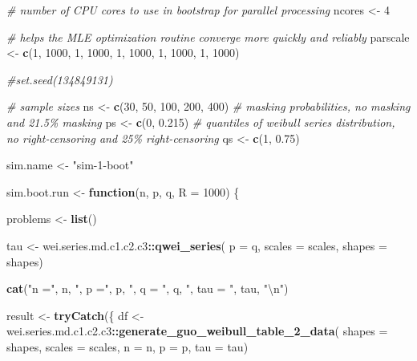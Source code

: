 \documentclass[
]{article}
\newenvironment{Shaded}{\begin{snugshade}}{\end{snugshade}}
\newcommand{\CharTok}[1]{\textcolor[rgb]{0.31,0.60,0.02}{#1}}
\newcommand{\CommentTok}[1]{\textcolor[rgb]{0.56,0.35,0.01}{\textit{#1}}}
\newcommand{\ControlFlowTok}[1]{\textcolor[rgb]{0.13,0.29,0.53}{\textbf{#1}}}
\newcommand{\DataTypeTok}[1]{\textcolor[rgb]{0.13,0.29,0.53}{#1}}
\newcommand{\DecValTok}[1]{\textcolor[rgb]{0.00,0.00,0.81}{#1}}
\newcommand{\FloatTok}[1]{\textcolor[rgb]{0.00,0.00,0.81}{#1}}
\newcommand{\KeywordTok}[1]{\textcolor[rgb]{0.13,0.29,0.53}{\textbf{#1}}}
\newcommand{\NormalTok}[1]{#1}
\newcommand{\OperatorTok}[1]{\textcolor[rgb]{0.81,0.36,0.00}{\textbf{#1}}}
\newcommand{\StringTok}[1]{\textcolor[rgb]{0.31,0.60,0.02}{#1}}
\begin{document}
\begin{Shaded}
\begin{Highlighting}[]
\CommentTok{\# number of CPU cores to use in bootstrap for parallel processing}
\NormalTok{ncores \textless{}{-}}\StringTok{ }\DecValTok{4}

\CommentTok{\# helps the MLE optimization routine converge more quickly and reliably}
\NormalTok{parscale \textless{}{-}}\StringTok{ }\KeywordTok{c}\NormalTok{(}\DecValTok{1}\NormalTok{, }\DecValTok{1000}\NormalTok{, }\DecValTok{1}\NormalTok{, }\DecValTok{1000}\NormalTok{, }\DecValTok{1}\NormalTok{, }\DecValTok{1000}\NormalTok{, }\DecValTok{1}\NormalTok{, }\DecValTok{1000}\NormalTok{, }\DecValTok{1}\NormalTok{, }\DecValTok{1000}\NormalTok{)}

\CommentTok{\#set.seed(134849131)}

\CommentTok{\# sample sizes}
\NormalTok{ns \textless{}{-}}\StringTok{ }\KeywordTok{c}\NormalTok{(}\DecValTok{30}\NormalTok{, }\DecValTok{50}\NormalTok{, }\DecValTok{100}\NormalTok{, }\DecValTok{200}\NormalTok{, }\DecValTok{400}\NormalTok{)}
\CommentTok{\# masking probabilities, no masking and 21.5\% masking}
\NormalTok{ps \textless{}{-}}\StringTok{ }\KeywordTok{c}\NormalTok{(}\DecValTok{0}\NormalTok{, }\FloatTok{0.215}\NormalTok{)}
\CommentTok{\# quantiles of weibull series distribution, no right{-}censoring and 25\% right{-}censoring}
\NormalTok{qs \textless{}{-}}\StringTok{ }\KeywordTok{c}\NormalTok{(}\DecValTok{1}\NormalTok{, }\FloatTok{0.75}\NormalTok{)}

\NormalTok{sim.name \textless{}{-}}\StringTok{ "sim{-}1{-}boot"}

\NormalTok{sim.boot.run \textless{}{-}}\StringTok{ }\ControlFlowTok{function}\NormalTok{(n, p, q, }\DataTypeTok{R =} \DecValTok{1000}\NormalTok{) \{}

\NormalTok{    problems \textless{}{-}}\StringTok{ }\KeywordTok{list}\NormalTok{()}

\NormalTok{    tau \textless{}{-}}\StringTok{ }\NormalTok{wei.series.md.c1.c2.c3}\OperatorTok{::}\KeywordTok{qwei\_series}\NormalTok{(}
        \DataTypeTok{p =}\NormalTok{ q, }\DataTypeTok{scales =}\NormalTok{ scales, }\DataTypeTok{shapes =}\NormalTok{ shapes)}

    \KeywordTok{cat}\NormalTok{(}\StringTok{"n ="}\NormalTok{, n, }\StringTok{", p ="}\NormalTok{, p, }\StringTok{", q = "}\NormalTok{, q, }\StringTok{", tau = "}\NormalTok{, tau, }\StringTok{"}\CharTok{\textbackslash{}n}\StringTok{"}\NormalTok{)}
  
\NormalTok{    result \textless{}{-}}\StringTok{ }\KeywordTok{tryCatch}\NormalTok{(\{}
\NormalTok{        df \textless{}{-}}\StringTok{ }\NormalTok{wei.series.md.c1.c2.c3}\OperatorTok{::}\KeywordTok{generate\_guo\_weibull\_table\_2\_data}\NormalTok{(}
            \DataTypeTok{shapes =}\NormalTok{ shapes,}
            \DataTypeTok{scales =}\NormalTok{ scales,}
            \DataTypeTok{n =}\NormalTok{ n,}
            \DataTypeTok{p =}\NormalTok{ p,}
            \DataTypeTok{tau =}\NormalTok{ tau)}


\end{Highlighting}
\end{Shaded}
\end{document}
